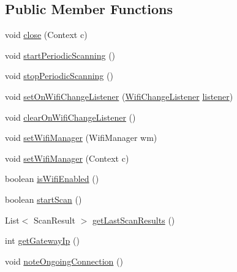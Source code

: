 \subsection*{Public Member Functions}
\begin{DoxyCompactItemize}
\item 
void \hyperlink{classeu_1_1uloop_1_1mobilitytracker_1_1MTrackerWifiManager_a0ae6d8cb214aa07a6a48bc309e0b048d}{close} (Context c)
\item 
void \hyperlink{classeu_1_1uloop_1_1mobilitytracker_1_1MTrackerWifiManager_a187b034f76574e923c35d7603ffdbc7d}{start\+Periodic\+Scanning} ()
\item 
void \hyperlink{classeu_1_1uloop_1_1mobilitytracker_1_1MTrackerWifiManager_aaf8329bd03615206626eaaf60b7163ac}{stop\+Periodic\+Scanning} ()
\item 
void \hyperlink{classeu_1_1uloop_1_1mobilitytracker_1_1MTrackerWifiManager_a4b552616ee756bea242c390b6a47cd6c}{set\+On\+Wifi\+Change\+Listener} (\hyperlink{interfaceeu_1_1uloop_1_1mobilitytracker_1_1WifiChangeListener}{Wifi\+Change\+Listener} \hyperlink{classeu_1_1uloop_1_1mobilitytracker_1_1MTrackerWifiManager_aa1d154da1bb361b67fa73df8c0c7ec37}{listener})
\item 
void \hyperlink{classeu_1_1uloop_1_1mobilitytracker_1_1MTrackerWifiManager_a0304fcdbd89e9a208a67f0ab8a453e97}{clear\+On\+Wifi\+Change\+Listener} ()
\item 
void \hyperlink{classeu_1_1uloop_1_1mobilitytracker_1_1MTrackerWifiManager_ab1b833477b2ca5133d7b4b331c76d06f}{set\+Wifi\+Manager} (Wifi\+Manager wm)
\item 
void \hyperlink{classeu_1_1uloop_1_1mobilitytracker_1_1MTrackerWifiManager_a792f2361acd11feb9a131bdd80aeaa81}{set\+Wifi\+Manager} (Context c)
\item 
boolean \hyperlink{classeu_1_1uloop_1_1mobilitytracker_1_1MTrackerWifiManager_a2a7c3866f9c861c69dc5538704e61f3a}{is\+Wifi\+Enabled} ()
\item 
boolean \hyperlink{classeu_1_1uloop_1_1mobilitytracker_1_1MTrackerWifiManager_ad2b16d54d73844b90ca70c3f5db5dc99}{start\+Scan} ()
\item 
List$<$ Scan\+Result $>$ \hyperlink{classeu_1_1uloop_1_1mobilitytracker_1_1MTrackerWifiManager_a9961121b64c00b92fbab42be62310b20}{get\+Last\+Scan\+Results} ()
\item 
int \hyperlink{classeu_1_1uloop_1_1mobilitytracker_1_1MTrackerWifiManager_a5299dd6c03960ebd8de22fba02fc3359}{get\+Gateway\+Ip} ()
\item 
void \hyperlink{classeu_1_1uloop_1_1mobilitytracker_1_1MTrackerWifiManager_a88a00c25db918ea426639072848ebb1f}{note\+Ongoing\+Connection} ()
\end{DoxyCompactItemize}
